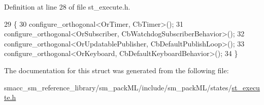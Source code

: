 Definition at line 28 of file st\+\_\+execute.\+h.


\begin{DoxyCode}
29     \{
30         configure\_orthogonal<OrTimer, CbTimer>();
31         configure\_orthogonal<OrSubscriber, CbWatchdogSubscriberBehavior>();
32         configure\_orthogonal<OrUpdatablePublisher, CbDefaultPublishLoop>();
33         configure\_orthogonal<OrKeyboard, CbDefaultKeyboardBehavior>();
34     \}
\end{DoxyCode}


The documentation for this struct was generated from the following file\+:\begin{DoxyCompactItemize}
\item 
smacc\+\_\+sm\+\_\+reference\+\_\+library/sm\+\_\+pack\+M\+L/include/sm\+\_\+pack\+M\+L/states/\hyperlink{st__execute_8h}{st\+\_\+execute.\+h}\end{DoxyCompactItemize}
